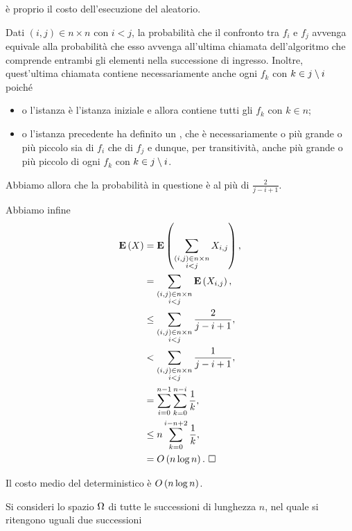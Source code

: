 \`e proprio il costo dell'esecuzione del  aleatorio.
\par Dati $(i,j) \in n \times n$ con $i < j$, la probabilit\`a che il confronto
tra $f_i$ e $f_j$ avvenga equivale alla probabilit\`a che esso avvenga
all'ultima chiamata dell'algoritmo che comprende entrambi gli elementi nella
successione di ingresso. Inoltre, quest'ultima chiamata contiene
necessariamente anche ogni $f_k$ con $k \in j \setminus i$ poich\'e
\begin{itemize}
  \item o l'istanza \`e l'istanza iniziale e allora contiene tutti gli $f_k$ con
    $k \in n$;
  \item o l'istanza precedente ha definito un , che \`e
    necessariamente o pi\`u grande o pi\`u piccolo sia di $f_i$ che di $f_j$ e
    dunque, per transitivit\`a, anche pi\`u grande o pi\`u piccolo di ogni $f_k$
    con $k \in j \setminus i$.
\end{itemize}
\par Abbiamo allora che la probabilit\`a in questione \`e al pi\`u di
$\frac{2}{j - i + 1}$.
\par Abbiamo infine
\begin{align*}
  \mathbf{E} \left ( X \right )
  &= \mathbf{E} \left ( 
    \sum_{\substack{(i,j) \in n \times n\\i < j}} X_{i,j} \right ),\\
  &= \sum_{\substack{(i,j) \in n \times n\\i < j}}
    \mathbf{E} \left ( X_{i,j} \right ),\\
  &\leq \sum_{\substack{(i,j) \in n \times n\\i < j}}
    \frac{2}{j - i + 1},\\
  &< \sum_{\substack{(i,j) \in n \times n\\i < j}}
    \frac{1}{j - i + 1},\\
  &= \sum_{i = 0}^{n - 1} \sum_{k = 0}^{n - i}
    \frac{1}{k},\\
  &\leq n \sum_{k = 0}^{i - n + 2}
    \frac{1}{k},\\
  &= O \left ( n \log n \right ).\text{ $\square$}
\end{align*}
\begin{Corollary}
  Il costo medio del  deterministico \`e
  $O \left ( n \log n \right )$.
\end{Corollary}
\Proof Si consideri lo spazio $\Omega$ di tutte le successioni di
lunghezza $n$, nel quale si ritengono uguali due successioni

